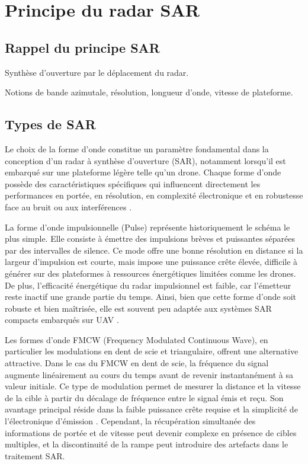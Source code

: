 \section{Principe du radar SAR}\label{SEC:Principe du radar SAR}

\subsection{Rappel du principe SAR}

Synthèse d’ouverture par le déplacement du radar.

Notions de bande azimutale, résolution, longueur d’onde, vitesse de plateforme.


\subsection{Types de SAR}

Le choix de la forme d’onde constitue un paramètre fondamental dans la conception d’un radar à synthèse d’ouverture (SAR), notamment lorsqu’il est embarqué sur une plateforme légère telle qu’un drone. Chaque forme d’onde possède des caractéristiques spécifiques qui influencent directement les performances en portée, en résolution, en complexité électronique et en robustesse face au bruit ou aux interférences \cite{richards2010principles, soumekh1999synthetic}.

La forme d’onde impulsionnelle (Pulse) représente historiquement le schéma le plus simple. Elle consiste à émettre des impulsions brèves et puissantes séparées par des intervalles de silence. Ce mode offre une bonne résolution en distance si la largeur d’impulsion est courte, mais impose une puissance crête élevée, difficile à générer sur des plateformes à ressources énergétiques limitées comme les drones. De plus, l’efficacité énergétique du radar impulsionnel est faible, car l’émetteur reste inactif une grande partie du temps. Ainsi, bien que cette forme d’onde soit robuste et bien maîtrisée, elle est souvent peu adaptée aux systèmes SAR compacts embarqués sur UAV \cite{skolnik2008radar}.

Les formes d’onde FMCW (Frequency Modulated Continuous Wave), en particulier les modulations en dent de scie et triangulaire, offrent une alternative attractive. Dans le cas du FMCW en dent de scie, la fréquence du signal augmente linéairement au cours du temps avant de revenir instantanément à sa valeur initiale. Ce type de modulation permet de mesurer la distance et la vitesse de la cible à partir du décalage de fréquence entre le signal émis et reçu. Son avantage principal réside dans la faible puissance crête requise et la simplicité de l’électronique d’émission \cite{ma2016compact}. Cependant, la récupération simultanée des informations de portée et de vitesse peut devenir complexe en présence de cibles multiples, et la discontinuité de la rampe peut introduire des artefacts dans le traitement SAR.


